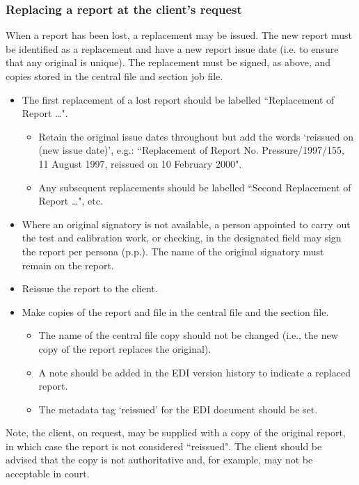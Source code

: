 \subsubsection{Replacing a report at the client's request}
When a report has been lost, a replacement may be issued. The new report must be identified as a replacement and have a new report issue date (i.e. to ensure that any original is unique). The replacement must be signed, as above, and copies stored in the central file and section job file. 
\begin{itemize}
\item The first replacement of a lost report should be labelled ``Replacement of Report \ldots". 
\begin{itemize}
\item Retain the original issue dates throughout but add the words `reissued on (new issue date)', e.g.: ``Replacement of Report No. Pressure/1997/155, 11 August 1997, reissued on 10 February 2000".
\item Any subsequent replacements should be labelled ``Second Replacement of Report \ldots", etc.
\end{itemize}

\item Where an original signatory is not available, a person appointed to carry out the test and calibration work, or checking, in the designated field may sign the report per persona (p.p.).  The name of the original signatory must remain on the report.

\item Reissue the report to the client.

\item Make copies of the report and file in the central file and the section file.
\begin{itemize}
\item The name of the central file copy should not be changed (i.e., the new copy of the report replaces the original). 
\item A note should be added in the EDI version history to indicate a replaced report.
\item The metadata tag ‘reissued’ for the EDI document should be set.
\end{itemize}
\end{itemize}

Note, the client, on request, may be supplied with a copy of the original report, in which case the report is not considered ``reissued". The client should be advised that the copy is not authoritative and, for example, may not be acceptable in court.

